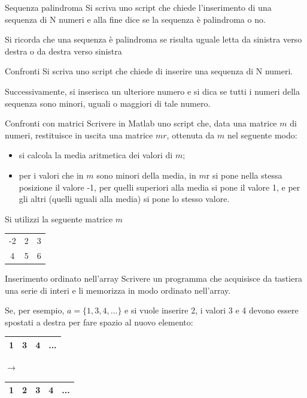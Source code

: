 \documentclass[format=169, handout]{beamer}
\begin{document}
\begin{frame}{Sequenza palindroma}
Si scriva uno script che chiede l’inserimento di una sequenza di N numeri e alla fine dice se la sequenza è palindroma o no.

Si ricorda che una sequenza è palindroma se risulta uguale letta da sinistra verso destra o da destra verso sinistra
\end{frame}

\begin{frame}{Confronti}
Si scriva uno script che chiede di inserire una sequenza di N numeri.

Successivamente, si inserisca un ulteriore numero e si dica se tutti i numeri della sequenza sono minori, uguali o maggiori di tale numero.
\end{frame}

\begin{frame}{Confronti con matrici}
Scrivere in Matlab uno script che, data una matrice $m$ di numeri, restituisce in uscita una matrice $mr$, ottenuta da $m$ nel seguente modo:
\begin{itemize}
	\item si calcola la media aritmetica dei valori di $m$;
	\item per i valori che in $m$ sono minori della media, in $m$r si
pone nella stessa posizione il valore -1, per quelli superiori alla media si pone il valore 1, e per gli altri (quelli uguali alla media) si pone lo stesso valore.
\end{itemize}

Si utilizzi la seguente matrice $m$

\centering
\begin{tabular}{|ccc|}
	\hline
	-2&2&3\\
	4&5&6\\
	\hline
\end{tabular}
\end{frame}

\begin{frame}{Inserimento ordinato nell'array}
Scrivere un programma che acquisisce da tastiera una serie di interi e li memorizza in modo ordinato nell'array.

\pause
Se, per esempio, $a = \{1, 3, 4, …\}$ e si vuole inserire 2, i valori 3 e 4 devono essere spostati a destra per fare spazio al nuovo elemento:

\centering
\begin{tabular}{|c|c|c|c|}
	\hline
	1&3&4&...\\
	\hline
\end{tabular}
$\rightarrow$
\begin{tabular}{|c|c|c|c|c|}
	\hline
	1& \alert{2} &3&4&...\\
	\hline
\end{tabular}

\end{frame}
\end{document}
